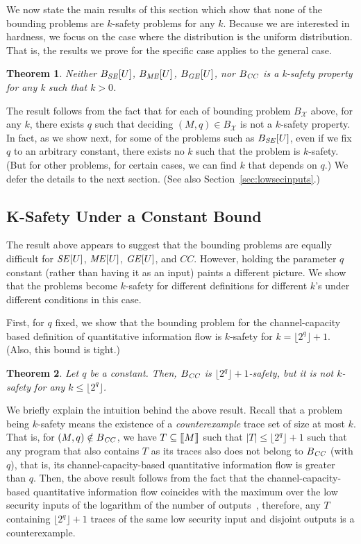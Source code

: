 \documentclass{llncs}
\newtheorem{theorem}{Theorem}[section]
\newcommand{\sembrack}[1]{[\hspace*{-1.2pt}[#1]\hspace*{-1.2pt}]}
\begin{document}
We now state the main results of this section which show that none of
the bounding problems are $k$-safety problems for any $k$.  Because we
are interested in hardness, we focus on the case where the
distribution is the uniform distribution.  That is, the results we
prove for the specific case applies to the general case.
\begin{theorem}
Neither $B_{\it SE}[U]$, $B_{\it ME}[U]$, $B_{\it GE}[U]$, nor $B_{\it
  CC}$ is a k-safety property for any k such that $k > 0$.
\label{thm:senk2}
\end{theorem}
The result follows from the fact that for each of bounding
  problem $B_\mathcal{X}$ above, for any $k$, there exists $q$ such
  that deciding $(M, q) \in B_\mathcal{X}$ is not a $k$-safety
  property.  In fact, as we show next, for some of the problems such
  as $B_{\it SE}[U]$, even if we fix $q$ to an arbitrary constant,
  there exists no $k$ such that the problem is $k$-safety.  (But for
  other problems, for certain cases, we can find $k$ that depends on
  $q$.)  We defer the details to the next section.  (See also
  Section~\ref{sec:lowsecinputs}.)
\subsection{K-Safety Under a Constant Bound}

\label{sec:ksafetyconst}

The result above appears to suggest that the bounding problems are
equally difficult for ${\it SE}[U]$, ${\it ME}[U]$, ${\it GE}[U]$, and
$CC$.  However, holding the parameter $q$ constant (rather than having
it as an input) paints a different picture.  We show that the problems
become $k$-safety for different definitions for different $k$'s under
different conditions in this case.

First, for $q$ fixed, we show that the bounding problem for the
channel-capacity based definition of quantitative information flow is
$k$-safety for $k = \lfloor2^q\rfloor + 1$.  (Also, this bound is
tight.)
\begin{theorem}
\label{thm:cck}
Let $q$ be a constant.  Then, $B_{\it CC}$ is
$\lfloor2^q\rfloor+1$-safety, but it is not $k$-safety for any $k \leq
\lfloor2^q\rfloor$.
\end{theorem}

We briefly explain the intuition behind the above result. Recall that
a problem being $k$-safety means the existence of a {\em
  counterexample} trace set of size at most $k$.  That is, for $(M, q)
\notin B_{\it CC}$, we have $T \subseteq \sembrack{M}$ such that $|T|
\leq \lfloor2^q\rfloor+1$ such that any program that also contains $T$
as its traces also does not belong to $B_{\it CC}$ (with $q$), that
is, its channel-capacity-based quantitative information flow is
greater than $q$.  Then, the above result follows from the fact that
the channel-capacity-based quantitative information flow coincides
with the maximum over the low security inputs of the logarithm of the
number of outputs~\cite{malacaria08}, therefore, any $T$ containing
$\lfloor 2^q\rfloor +1$ traces of the same low security input and
disjoint outputs is a counterexample.
\end{document}
